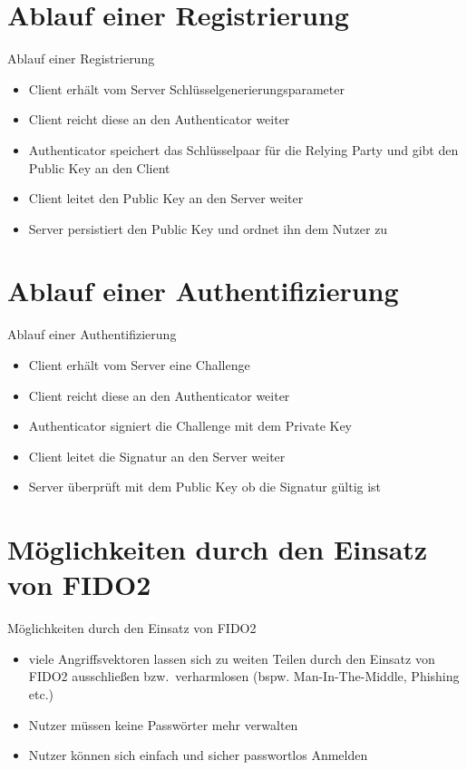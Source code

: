 \documentclass{beamer}
\begin{document}
\section{Ablauf einer Registrierung}
\begin{frame}{Ablauf einer Registrierung}
	\begin{itemize}
		\item Client erhält vom Server Schlüsselgenerierungsparameter
		\item Client reicht diese an den Authenticator weiter
		\item Authenticator speichert das Schlüsselpaar für die Relying Party und gibt den Public Key an den Client
		\item Client leitet den Public Key an den Server weiter
		\item Server persistiert den Public Key und ordnet ihn dem Nutzer zu
	\end{itemize}
\end{frame}

\section{Ablauf einer Authentifizierung}
\begin{frame}{Ablauf einer Authentifizierung}
	\begin{itemize}
		\item Client erhält vom Server eine Challenge
		\item Client reicht diese an den Authenticator weiter
		\item Authenticator signiert die Challenge mit dem Private Key
		\item Client leitet die Signatur an den Server weiter
		\item Server überprüft mit dem Public Key ob die Signatur gültig ist
	\end{itemize}
\end{frame}

\section{Möglichkeiten durch den Einsatz von FIDO2}
\begin{frame}{Möglichkeiten durch den Einsatz von FIDO2}
	\begin{itemize}
		\item viele Angriffsvektoren lassen sich zu weiten Teilen durch den
			Einsatz von FIDO2 ausschließen bzw.\ verharmlosen (bspw.
			Man-In-The-Middle, Phishing etc.)
		\item Nutzer müssen keine Passwörter mehr verwalten
		\item Nutzer können sich einfach und sicher passwortlos Anmelden
	\end{itemize}
\end{frame}
\end{document}
